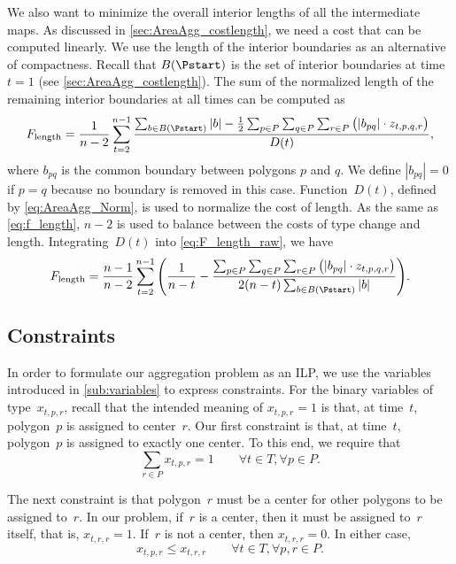 We also want to minimize the overall interior lengths of all the 
intermediate maps.
As discussed in \sect\ref{sec:AreaAgg_costlength},
we need a cost that can be computed linearly.
We use the length of the interior boundaries 
as an alternative of compactness.
Recall that $B(\Pstart)$ is the set of interior boundaries 
at time $t=1$ (see \sect\ref{sec:AreaAgg_costlength}).
The sum of the normalized length of the remaining interior 
boundaries at all 
times can be 
computed as
\begin{equation}
\label{eq:F_length_raw}
F_\mathrm{length}
=\frac{1}{n-2} \sum_{t=2}^{n-1} 
\frac{\sum_{b\in B (\Pstart)} |b| - 
	\frac{1}{2} \sum_{p \in P}\sum_{q \in P}\sum_{r \in P} 
	\big(|b_{pq}|\cdot z_{t,p,q,r}\big)}
{D(t)},
\end{equation}
where $b_{pq}$ is the common boundary 
between polygons $p$ and $q$. 
We define $|b_{pq}|=0$ if $p=q$ 
because no boundary is removed in this case.
Function~$D(t)$, defined by \eq\ref{eq:AreaAgg_Norm}, 
is used to normalize the cost of length.
As the same as \eq\ref{eq:f_length}, 
$n-2$ is used to balance 
between the costs of type change and length.
Integrating~$D(t)$ into \eq\ref{eq:F_length_raw}, we have
\begin{equation}
\label{eq:F_length}
F_\mathrm{length}
=\frac{n-1}{n-2} \sum_{t=2}^{n-1}
\Bigg(
\frac{1}{n-t} -
\frac{\sum_{p \in P}\sum_{q \in P}\sum_{r \in P} 
	\big(|b_{pq}|\cdot z_{t,p,q,r}\big)}
{2(n-t)\sum_{b\in B (\Pstart)} |b| }
\Bigg).
\end{equation}




\subsection{Constraints}

In order to formulate our aggregation problem as an ILP, we use the
variables introduced in \sect\ref{sub:variables} to express 
constraints.
For the binary variables of type~$x_{t,p,r}$, recall that the intended
meaning of $x_{t,p,r}=1$ is that, at
time~$t$, polygon~$p$ is assigned to center~$r$. 
Our first constraint is that, at time~$t$, polygon~$p$ is assigned to 
exactly one center. To this end, we require 
that
\begin{equation}
\label{eq:CstrOneCenter}
\sum_{r\in P} x_{t,p,r}=1 \qquad
\forall t \in {T}, \forall p \in P.
\end{equation}

The next constraint is that polygon~$r$ must be a center
for other polygons to be assigned to~$r$.
In our problem, if~$r$ is a center, 
then it must be assigned to~$r$ itself,
that is, $x_{t,r,r}=1$.
If~$r$ is not a center, then $x_{t,r,r}=0$.
In either case,
\begin{equation}
\label{eq:CstrAssign}
x_{t,p,r} \leq x_{t,r,r} \qquad
\forall t \in {T}, \forall  p, r \in P.
\end{equation}

